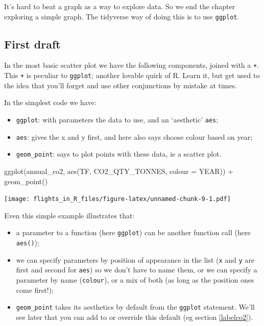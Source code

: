 \documentclass[
]{book}
\newenvironment{Shaded}{\begin{snugshade}}{\end{snugshade}}
\newcommand{\AttributeTok}[1]{\textcolor[rgb]{0.77,0.63,0.00}{#1}}
\newcommand{\FunctionTok}[1]{\textcolor[rgb]{0.00,0.00,0.00}{#1}}
\newcommand{\NormalTok}[1]{#1}
\newcommand{\SpecialCharTok}[1]{\textcolor[rgb]{0.00,0.00,0.00}{#1}}
\providecommand{\tightlist}{%
  \setlength{\itemsep}{0pt}\setlength{\parskip}{0pt}}
\begin{document}
It's hard to beat a graph as a way to explore data. So we end the chapter exploring a simple graph. The tidyverse way of doing this is to use \texttt{ggplot}.

\hypertarget{first-draft}{%
\subsection{First draft}\label{first-draft}}

In the most basic scatter plot we have the following components, joined with a \texttt{+}. This \texttt{+} is peculiar to \texttt{ggplot}; another lovable quirk of R. Learn it, but get used to the idea that you'll forget and use other conjunctions by mistake at times.

In the simplest code we have:

\begin{itemize}
\tightlist
\item
  \texttt{ggplot}: with parameters the data to use, and an `aesthetic' \texttt{aes};
\item
  \texttt{aes}: gives the x and y first, and here also says choose colour based on year;
\item
  \texttt{geom\_point}: says to plot points with these data, ie a scatter plot.
\end{itemize}

\begin{Shaded}
\begin{Highlighting}[]
\FunctionTok{ggplot}\NormalTok{(annual\_co2, }
       \FunctionTok{aes}\NormalTok{(TF, CO2\_QTY\_TONNES, }\AttributeTok{colour =}\NormalTok{ YEAR)) }\SpecialCharTok{+}
  \FunctionTok{geom\_point}\NormalTok{() }
\end{Highlighting}
\end{Shaded}

\texttt{[image: flights\_in\_R\_files/figure-latex/unnamed-chunk-9-1.pdf]}

Even this simple example illustrates that:

\begin{itemize}
\tightlist
\item
  a parameter to a function (here \texttt{ggplot}) can be another function call (here \texttt{aes()});
\item
  we can specify parameters by position of appearance in the list (\texttt{x} and \texttt{y} are first and second for \texttt{aes}) so we don't have to name them, or we can specify a parameter by name (\texttt{colour}), or a mix of both (as long as the position ones come first!);
\item
  \texttt{geom\_point} takes its aesthetics by default from the \texttt{ggplot} statement. We'll see later that you can add to or override this default (eg section \ref{labelco2}).
\end{itemize}
\end{document}
